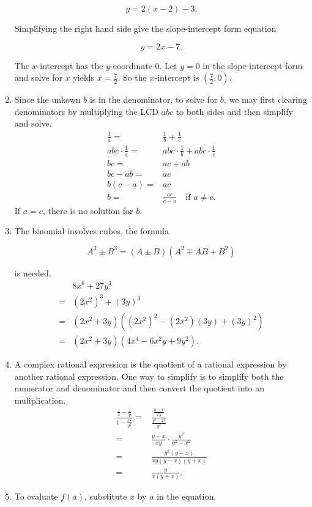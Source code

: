 \documentclass[
  12pt]{article}
\begin{document}
\begin{enumerate}
  \[y=2(x-2)-3.\]

  Simplifying the right hand side give the slope-intercept form equation

  \[y=2x-7.\]

  The \(x\)-intercept has the \(y\)-coordinate \(0\). Let \(y=0\) in the
  slope-intercept form and solve for \(x\) yields \(x=\frac72\). So the
  \(x\)-intercept is \(\left(\frac{7}{2},0\right)\).
\item
  Since the unkown \(b\) is in the denominator, to solve for \(b\), we
  may first clearing denominators by multiplying the LCD \(abc\) to both
  sides and then simplify and solve. \[
  \begin{aligned}
  \frac1a=&\frac1b+\frac1c\\
  abc\cdot\frac1a=&abc\cdot\frac1b+abc\cdot\frac1c\\
  bc=&ac+ab\\
  bc-ab=&ac\\
  b(c-a)=&ac\\
  b=&\frac{ac}{c-a}\quad\text{if }a\ne c.
  \end{aligned}
  \] If \(a=c\), there is no solution for \(b\).
\item
  The binomial involves cubes, the formula

  \[A^3\pm B^3=(A\pm B)(A^2\mp AB+B^2)\]

  is needed. \[
  \begin{aligned}
  &8x^6+27y^3\\
  =&(2x^2)^3+(3y)^3\\
  =&(2x^2 + 3y)((2x^2)^2-(2x^2)(3y)+(3y)^2)\\
  =&(2x^2 + 3y)(4x^4-6x^2y+9y^2).
  \end{aligned}
  \]
\item
  A complex rational expression is the quotient of a rational expression
  by another rational expression. One way to simplify is to simplify
  both the numerator and denominator and then convert the quotient into
  an muliplication. \[
  \begin{aligned}
  \frac{\frac1x-\frac1y}{1-\frac{x^2}{y^2}}
  =&\frac{\frac{y-x}{xy}}{\frac{y^2-x^2}{y^2}}\\
  =&\frac{y-x}{xy}\cdot\frac{y^2}{y^2-x^2}\\
  =&\frac{y^2(y-x)}{xy(y-x)(y+x)}\\
  =&\frac{y}{x(y+x)}.
  \end{aligned}
  \]
\item
  To evaluate \(f(a)\), substitute \(x\) by \(a\) in the equation.


\end{enumerate}
\end{document}
